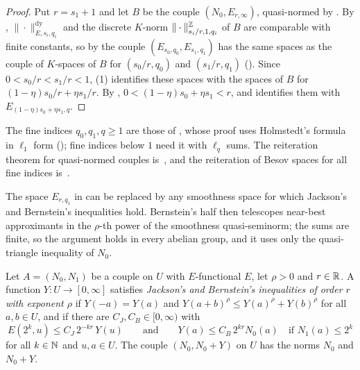 \begin{proof}
\leanok
{}
Put $r = s_1 + 1$ and let $B$ be the couple $(N_0, E_{r, \infty})$, quasi-normed by
. By , $\|\cdot\|^{\mathrm{dy}}_{E, s_i, q_i}$ and
the discrete $K$-norm $\|\cdot\|^{\mathbb{Z}}_{s_i/r, 1, q_i}$ of $B$ are comparable with finite
constants, so by  the couple $(E_{s_0, q_0}, E_{s_1, q_1})$ has the
same spaces as the couple of $K$-spaces of $B$ for $(s_0/r, q_0)$ and $(s_1/r, q_1)$
(). Since $0 < s_0/r < s_1/r < 1$,  (1)
identifies these spaces with the spaces of $B$ for $(1 - \eta) s_0/r + \eta s_1/r$. By
, $0 < (1 - \eta) s_0 + \eta s_1 < r$, and
 identifies them with $E_{(1-\eta)s_0 + \eta s_1, q}$.
\end{proof}

The fine indices $q_0, q_1, q \geq 1$ are those of , whose proof uses
Holmstedt's formula in $\ell_1$ form (); fine indices below $1$ need it with
$\ell_q$ sums. The reiteration theorem for quasi-normed couples
is~\cite[Theorem~3.11.5]{BerghLofstrom}, and the reiteration of Besov spaces for all fine
indices is~\cite[Corollary~6.2]{DeVorePopovTAMS}.

The space $E_{r, q_1}$ in  can be replaced by any smoothness
space for which Jackson's and Bernstein's inequalities hold. Bernstein's half then telescopes
near-best approximants in the $\rho$-th power of the smoothness quasi-seminorm; the sums are
finite, so the argument holds in every abelian group, and it uses only the quasi-triangle
inequality of $N_0$.

\begin{definition}
\label{def:jackson-bernstein-data}
\leanok
{}
Let $A = (N_0, N_1)$ be a couple on $U$ with $E$-functional $E$, let $\rho > 0$ and
$r \in \mathbb{R}$. A function $Y : U \to [0, \infty]$ satisfies \emph{Jackson's and
Bernstein's inequalities of order $r$ with exponent $\rho$} if $Y(-a) = Y(a)$ and
$Y(a + b)^\rho \leq Y(a)^\rho + Y(b)^\rho$ for all $a, b \in U$, and if there are
$C_J, C_B \in [0, \infty)$ with
\[
  E(2^k, u) \leq C_J \, 2^{-kr} \, Y(u)
  \qquad \text{and} \qquad
  Y(a) \leq C_B \, 2^{kr} N_0(a) \quad \text{if } N_1(a) \leq 2^k
\]
for all $k \in \mathbb{N}$ and $u, a \in U$. The couple $(N_0, N_0 + Y)$ on $U$ has the norms $N_0$ and
$N_0 + Y$.
\end{definition}


